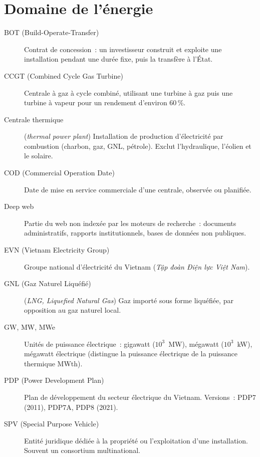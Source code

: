 \section*{Domaine de l'énergie}

\begin{description}
\item[BOT (Build-Operate-Transfer)] Contrat de concession~: un investisseur construit et exploite une installation pendant une durée fixe, puis la transfère à l'État.
\item[CCGT (Combined Cycle Gas Turbine)] Centrale à gaz à cycle combiné, utilisant une turbine à gaz puis une turbine à vapeur pour un rendement d'environ 60\,\%.
\item[Centrale thermique] (\emph{thermal power plant}) Installation de production d'électricité par combustion (charbon, gaz, GNL, pétrole). Exclut l'hydraulique, l'éolien et le solaire.
\item[COD (Commercial Operation Date)] Date de mise en service commerciale d'une centrale, observée ou planifiée.
\item[Deep web] Partie du web non indexée par les moteurs de recherche~: documents administratifs, rapports institutionnels, bases de données non publiques.
\item[EVN (Vietnam Electricity Group)] Groupe national d'électricité du Vietnam (\emph{Tập đoàn Điện lực Việt Nam}).
\item[GNL (Gaz Naturel Liquéfié)] (\emph{LNG, Liquefied Natural Gas}) Gaz importé sous forme liquéfiée, par opposition au gaz naturel local.
\item[GW, MW, MWe] Unités de puissance électrique~: gigawatt ($10^3$~MW), mégawatt ($10^3$~kW), mégawatt électrique (distingue la puissance électrique de la puissance thermique MWth).
\item[PDP (Power Development Plan)] Plan de développement du secteur électrique du Vietnam. Versions~: PDP7 (2011), PDP7A, PDP8 (2021).
\item[SPV (Special Purpose Vehicle)] Entité juridique dédiée à la propriété ou l'exploitation d'une installation. Souvent un consortium multinational.
\end{description}

